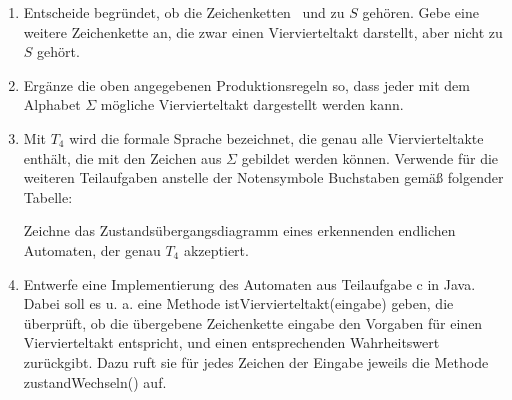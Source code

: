 \documentclass{bschlangaul-aufgabe}
\begin{document}
\begin{enumerate}


\item Entscheide begründet, ob die Zeichenketten
\quarterNote\quarterNote\quarterNote\quarterNote\ und
\quarterNote\halfNote\quarterNote{} zu $S$ gehören. Gebe eine weitere
Zeichenkette an, die zwar einen Viervierteltakt darstellt, aber nicht zu
$S$ gehört.


\item Ergänze die oben angegebenen Produktionsregeln so, dass jeder mit
dem Alphabet $\Sigma$ mögliche Viervierteltakt dargestellt werden kann.


\item Mit $T_4$ wird die formale Sprache bezeichnet, die genau alle
Viervierteltakte enthält, die mit den Zeichen aus $\Sigma$ gebildet werden
können. Verwende für die weiteren Teilaufgaben anstelle der Notensymbole
Buchstaben gemäß folgender Tabelle:

Zeichne das Zustandsübergangsdiagramm eines erkennenden endlichen
Automaten, der genau $T_4$ akzeptiert.


\item Entwerfe eine Implementierung des Automaten aus Teilaufgabe c in
Java. Dabei soll es u. a. eine Methode istViervierteltakt(eingabe)
geben, die überprüft, ob die übergebene Zeichenkette eingabe den
Vorgaben für einen Viervierteltakt entspricht, und einen entsprechenden
Wahrheitswert zurückgibt. Dazu ruft sie für jedes Zeichen der Eingabe
jeweils die Methode zustandWechseln() auf.
\end{enumerate}
\end{document}
